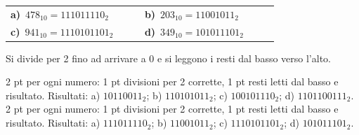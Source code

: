 \begin{esercizio}[8]
\begin{solution}
{\par\smallskip\noindent\hspace*{1em}\begin{tabular}{@{}p{0.42\linewidth}p{0.42\linewidth}@{}}
  \textbf{a)}~$478_{10} = 111011110_2$ & \textbf{b)}~$203_{10} = 11001011_2$\\[4pt]
  \textbf{c)}~$941_{10} = 1110101101_2$ & \textbf{d)}~$349_{10} = 101011101_2$
\end{tabular}\par\smallskip
  Si divide per 2 fino ad arrivare a 0 e si leggono i resti dal basso verso l'alto.}
  \criterioRR
  {2 pt per ogni numero: 1 pt divisioni per 2 corrette, 1 pt resti letti dal basso e risultato. Risultati: a) $10110011_2$; b) $110101011_2$; c) $100101110_2$; d) $1101100111_2$.}
  {2 pt per ogni numero: 1 pt divisioni per 2 corrette, 1 pt resti letti dal basso e risultato. Risultati: a) $111011110_2$; b) $11001011_2$; c) $1110101101_2$; d) $101011101_2$.}
\end{solution}
\end{esercizio}

